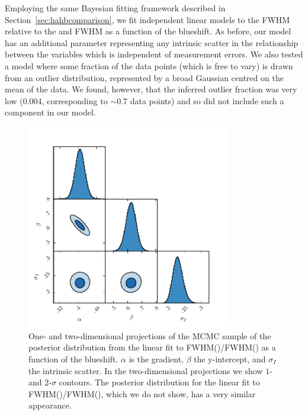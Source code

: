 Employing the same Bayesian fitting framework described in Section~\ref{sec:hahbcomparison}, we fit independent linear models to the  FWHM relative to the \ha and \hb FWHM as a function of the  blueshift.
As before, our model has an additional parameter representing any intrinsic scatter in the relationship between the variables which is independent of measurement errors.
We also tested a model where some fraction of the data points (which is free to vary) is drawn from an outlier distribution, represented by a broad Gaussian centred on the mean of the data.
We found, however, that the inferred outlier fraction was very low ($0.004$, corresponding to $\sim0.7$ data points) and so did not include such a component in our model.

\begin{figure}
    \centering
    \includegraphics[width=0.8\textwidth]{figures/chapter03/civ_ha_mcmc_parameters.pdf}
    \caption[{Projections of the MCMC sample of the posterior distribution for a linear fit to FWHM()/FWHM(\hans) as a function of the  blueshift.}]{One- and two-dimensional projections of the MCMC sample of the posterior distribution from the linear fit to FWHM()/FWHM(\hans) as a function of the  blueshift. $\alpha$ is the gradient, $\beta$ the y-intercept, and $\sigma_I$ the intrinsic scatter. In the two-dimensional projections we show $1$- and $2$-$\sigma$ contours. The posterior distribution for the linear fit to FWHM()/FWHM(\hbns), which we do not show, has a very similar appearance.}
    \label{fig:mcmc_parameters}
\end{figure}

